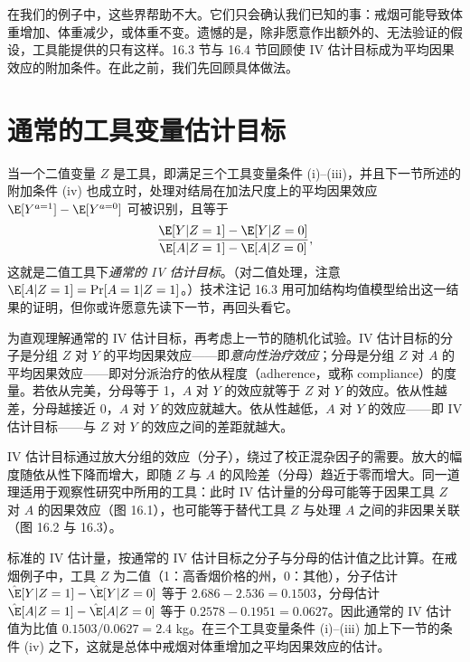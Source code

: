 在我们的例子中，这些界帮助不大。它们只会确认我们已知的事：戒烟可能导致体重增加、体重减少，或体重不变。遗憾的是，除非愿意作出额外的、无法验证的假设，工具能提供的只有这样。16.3 节与 16.4 节回顾使 IV 估计目标成为平均因果效应的附加条件。在此之前，我们先回顾具体做法。

\section{通常的工具变量估计目标}

当一个二值变量 $Z$ 是工具，即满足三个工具变量条件 (i)–(iii)，并且下一节所述的附加条件 (iv) 也成立时，处理对结局在加法尺度上的平均因果效应 $\E[Y^{a=1}]-\E[Y^{a=0}]$ 可被识别，且等于
\[
\frac{\E[Y|Z=1]-\E[Y|Z=0]}{\E[A|Z=1]-\E[A|Z=0]},
\]
这就是二值工具下\emph{通常的 IV 估计目标}。（对二值处理，注意 $\E[A|Z=1]=\Pr[A=1|Z=1]$。）技术注记 16.3 用可加结构均值模型给出这一结果的证明，但你或许愿意先读下一节，再回头看它。

为直观理解通常的 IV 估计目标，再考虑上一节的随机化试验。IV 估计目标的分子是分组 $Z$ 对 $Y$ 的平均因果效应——即\emph{意向性治疗效应}；分母是分组 $Z$ 对 $A$ 的平均因果效应——即对分派治疗的依从程度（adherence，或称 compliance）的度量。若依从完美，分母等于 1，$A$ 对 $Y$ 的效应就等于 $Z$ 对 $Y$ 的效应。依从性越差，分母越接近 0，$A$ 对 $Y$ 的效应就越大。依从性越低，$A$ 对 $Y$ 的效应——即 IV 估计目标——与 $Z$ 对 $Y$ 的效应之间的差距就越大。

IV 估计目标通过放大分组的效应（分子），绕过了校正混杂因子的需要。放大的幅度随依从性下降而增大，即随 $Z$ 与 $A$ 的风险差（分母）趋近于零而增大。同一道理适用于观察性研究中所用的工具：此时 IV 估计量的分母可能等于因果工具 $Z$ 对 $A$ 的因果效应（图 16.1），也可能等于替代工具 $Z$ 与处理 $A$ 之间的非因果关联（图 16.2 与 16.3）。

标准的 IV 估计量，按通常的 IV 估计目标之分子与分母的估计值之比计算。在戒烟例子中，工具 $Z$ 为二值（1：高香烟价格的州，0：其他），分子估计 $\hat{\E}[Y|Z=1]-\hat{\E}[Y|Z=0]$ 等于 $2.686-2.536=0.1503$，分母估计 $\hat{\E}[A|Z=1]-\hat{\E}[A|Z=0]$ 等于 $0.2578-0.1951=0.0627$。因此通常的 IV 估计值为比值 $0.1503/0.0627=2.4$ kg。在三个工具变量条件 (i)–(iii) 加上下一节的条件 (iv) 之下，这就是总体中戒烟对体重增加之平均因果效应的估计。

